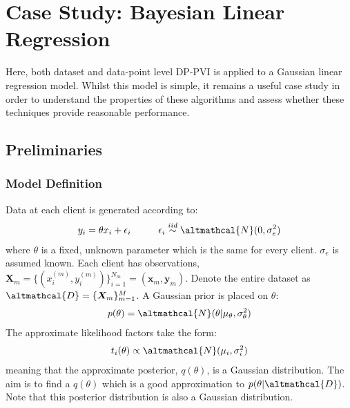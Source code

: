 
\chapter{Case Study: Bayesian Linear Regression}
%
\graphicspath{{Results/Figs}}

Here, both dataset and data-point level DP-PVI is applied to a Gaussian linear regression model. Whilst this model is simple, it remains a useful case study in order to understand the properties of these algorithms and assess whether these techniques provide reasonable performance.

\section{Preliminaries}
\subsection{Model Definition}
Data at each client is generated according to:
\begin{align}
y_i = \theta x_i + \epsilon_i \hspace{1cm} \epsilon_i \stackrel{iid}{\sim} \altmathcal{N}(0, \sigma_e^2) \label{eq:likelihood}
\end{align}
where $\theta$ is a fixed, unknown parameter which is the same for every client. $\sigma_e$ is assumed known. Each client has observations, $\bm{X}_m = \lbrace (x_i^{(m)}, y_i^{(m)}) \rbrace_{i=1}^{N_m} = (\bm{x}_m, \bm{y}_m)$. Denote the entire dataset as $\altmathcal{D} = \lbrace \bm{X}_m \rbrace_{m=1}^{M}$. A Gaussian prior is placed on $\theta$:
\begin{align}
p(\theta) = \altmathcal{N}(\theta| \mu_\theta, \sigma_\theta^2)
\end{align}
The approximate likelihood factors take the form:
\begin{align}
	t_i(\theta) \propto  \altmathcal{N}(\mu_i, \sigma_i^2)
\end{align}
meaning that the approximate posterior, $q(\theta)$, is a Gaussian distribution. The aim is to find a $q(\theta)$ which is a good approximation to $p(\theta | \altmathcal{D})$. Note that this posterior distribution is also a Gaussian distribution.

